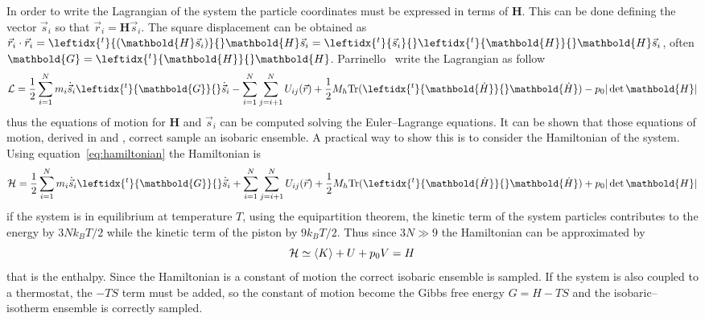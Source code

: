In order to write the Lagrangian of the system the particle coordinates must be expressed in terms of 
$\mathbold{H}$. This can be done defining the vector $\vec s_i$ so that $\vec r_i =  \mathbold{H} \vec s_i$. The 
square displacement can be obtained as $\vec r_i \cdot \vec r_i = \leftidx{^t}{ (\mathbold{H} \vec s_i)}{}  \mathbold{H} \vec s_i = \leftidx{^t}{\vec s_i}{} \leftidx{^t}{ \mathbold{H}}{}  \mathbold{H} \vec s_i$, often 
$\mathbold{G} = \leftidx{^t}{ \mathbold{H}}{} \mathbold{H}$. Parrinello \etal\, write the Lagrangian as follow
\begin{equation*}
	\mathcal{L} = \frac{1}{2}\sum_{i=1}^N m_i \dot{\vec s}_i \leftidx{^t}{\mathbold{G}}{} \dot{\vec s}_i - \sum_{i=1}^N \sum_{j=i+1}^N U_{ij}(\vec r) +  \frac{1}{2} M_h \text{Tr}(\leftidx{^t}{\mathbold{\dot H}}{} \mathbold{\dot H} ) -  p_0 |\det \mathbold{H}|
\end{equation*}
thus the equations of motion for $ \mathbold{H}$ and $\vec s_i$ can be computed solving the Euler--Lagrange 
equations. It can be shown that those equations of motion, derived in \cite{ParrinelloBarostat1} and 
\cite{ParrinelloBarostat2}, correct sample an isobaric ensemble. A practical way to show this is to consider the 
Hamiltonian of the system. Using equation~\eqref{eq:hamiltonian} the Hamiltonian is
\begin{equation*}
	\mathcal{H} = \frac{1}{2}\sum_{i=1}^N m_i \dot{\vec s}_i \leftidx{^t}{\mathbold{G}}{} \dot{\vec s}_i + \sum_{i=1}^N \sum_{j=i+1}^N U_{ij}(\vec r) +  \frac{1}{2} M_h \text{Tr}( \leftidx{^t}{\mathbold{\dot H}}{} \mathbold{\dot H} ) + p_0 |\det\mathbold{H}|
\end{equation*}
if the system is in equilibrium at temperature $T$, using the equipartition theorem, the kinetic term of the 
system particles contributes to the energy by $3Nk_BT/2$ while the kinetic term of the piston by $9k_BT/2$. Thus 
since $3N \gg 9$ the Hamiltonian can be approximated by
\begin{equation*}
	\mathcal{H} \simeq \left \langle K \right \rangle + U + p_0 V = H
\end{equation*}
that is the enthalpy. Since the Hamiltonian is a constant of motion the correct isobaric ensemble is sampled. If 
the system is also coupled to a thermostat, the $-TS$ term must be added, so the constant of motion become the 
Gibbs free energy $G = H - TS$ and the isobaric--isotherm ensemble is correctly sampled.

